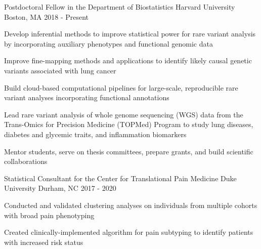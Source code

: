 

\begin{cventries}
\cventry
{Postdoctoral Fellow in the Department of Biostatistics} %
{Harvard University} %
{Boston, MA} %
{2018 - Present} %
{
	\begin{cvitems} %
		\item {Develop inferential methods to improve statistical power for rare variant analysis by incorporating auxiliary phenotypes and functional genomic data}
		\item {Improve fine-mapping methods and applications to identify likely causal genetic variants  associated with lung cancer}
		\item {Build cloud-based computational pipelines for large-scale, reproducible rare variant analyses incorporating functional annotations}
		\item {Lead rare variant analysis of whole genome sequencing (WGS) data from the Trans-Omics for Precision Medicine (TOPMed) Program to study lung diseases, diabetes and glycemic traits, and inflammation biomarkers}
		\item {Mentor students, serve on thesis committees, prepare grants, and build scientific collaborations}
	\end{cvitems}
}


  \cventry
    {Statistical Consultant for the Center for Translational Pain Medicine} %
    {Duke University} %
    {Durham, NC} %
    {2017 - 2020} %
    {
      \begin{cvitems} %
        \item {Conducted and validated clustering analyses on individuals from multiple cohorts with broad pain phenotyping}
        \item {Created clinically-implemented algorithm for pain subtyping to identify patients with increased risk status}
      \end{cvitems}
    }


\end{cventries}
